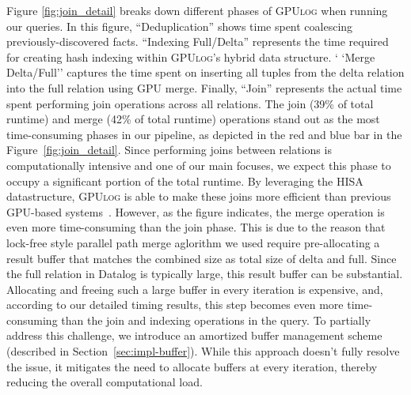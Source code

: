 \documentclass[nonacm,sigplan]{acmart}
\newcommand{\tool}{\textsc{GPUlog}}
\newcommand{\revised}[1]{{#1}}
\begin{document}
Figure \ref{fig:join_detail} breaks down different phases of \tool{} when running our queries. In this figure, ``Deduplication'' shows time spent coalescing previously-discovered facts. ``Indexing Full/Delta'' represents the time required for creating hash indexing within \tool's hybrid data structure. `
`Merge Delta/Full'' captures the time spent on inserting all tuples from the delta relation into the full relation using GPU merge. 
Finally, ``Join'' represents the actual time spent performing join operations across all relations. 
\revised{The join (39\% of total runtime) and merge (42\% of total runtime) operations stand out as the most time-consuming phases in our pipeline, as depicted in the red and blue bar in the Figure~\ref{fig:join_detail}. Since performing joins between relations is computationally intensive and one of our main focuses, we expect this phase to occupy a significant portion of the total runtime. By leveraging the HISA datastructure, \tool{} is able to make these joins more efficient than previous GPU-based systems~\cite{shovon2023towards,shovon2022accelerating}. However, as the figure indicates, the merge operation is even more time-consuming than the join phase. 
This is due to the reason that lock-free style parallel path merge aglorithm we used require pre-allocating a result buffer that matches the combined size as total size of delta and full. Since the full relation in Datalog is typically large, this result buffer can be substantial. Allocating and freeing such a large buffer in every iteration is expensive, and, according to our detailed timing results, this step becomes even more time-consuming than the join and indexing operations in the query.
To partially address this challenge, we introduce an amortized buffer management scheme (described in Section~\ref{sec:impl-buffer}). While this approach doesn’t fully resolve the issue, it mitigates the need to allocate buffers at every iteration, thereby reducing the overall computational load.}
\end{document}

